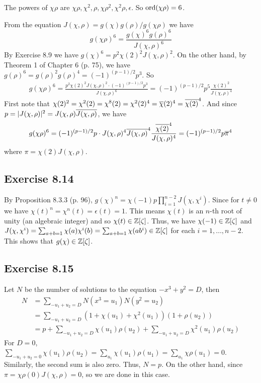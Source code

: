 \documentclass[../I&R.tex]{subfiles}
\begin{document}
The powers of $\chi\rho$ are $\chi\rho,\chi^2,\rho,\chi\rho^2,\chi^2\rho,\epsilon$. So $\operatorname{ord}(\chi\rho)=6$.

From the equation $J(\chi,\rho)=g(\chi)g(\rho)/g(\chi\rho)$ we have $$g(\chi\rho)^6=\frac{g(\chi)^6g(\rho)^6}{J(\chi,\rho)^6}$$ By Exercise 8.9 we have $g(\chi)^6=p^2\chi(2)^2J(\chi,\rho)^2$. On the other hand, by Theorem 1 of Chapter 6 (p. 75), we have $g(\rho)^6=g(\rho)^2g(\rho)^4=(-1)^{(p-1)/2}p^3$. So
\begin{align*}
    g(\chi\rho)^6 = \frac{p^2\chi(2)^2J(\chi,\rho)^2\cdot(-1)^{(p-1)/2}p^3}{J(\chi,\rho)^6} = (-1)^{(p-1)/2}p^5\frac{\chi(2)^2}{J(\chi,\rho)^4}
\end{align*}
First note that $\chi(2)^2=\chi^2(2)=\chi^8(2)=\chi^2(2)^4=\overline{\chi}(2)^4=\overline{\chi(2)}^4$. And since $p=|J(\chi,\rho)|^2=J(\chi,\rho)\overline{J(\chi,\rho)}$, we have
\begin{align*}
    g(\chi\rho)^6 = (-1)^{(p-1)/2}p\cdot J(\chi,\rho)^4\overline{J(\chi,\rho)}^4\frac{\overline{\chi(2)}^4}{J(\chi,\rho)^4} = (-1)^{(p-1)/2}p\overline{\pi}^4
\end{align*}
where $\pi=\chi(2)J(\chi,\rho)$.

\subsection*{Exercise 8.14}

By Proposition 8.3.3 (p. 96), $g(\chi)^n=\chi(-1)p\prod_{i=1}^{n-2} J(\chi,\chi^i)$. Since for $t\neq0$ we have $\chi(t)^n=\chi^n(t)=\epsilon(t)=1$. This means $\chi(t)$ is an $n$-th root of unity (an algebraic integer) and so $\chi(t)\in\mathbb{Z}[\zeta]$. Thus, we have $\chi(-1)\in\mathbb{Z}[\zeta]$ and $J(\chi,\chi^i)=\sum_{a+b=1} \chi(a)\chi^i(b)=\sum_{a+b=1} \chi(ab^i)\in\mathbb{Z}[\zeta]$ for each $i=1,\ldots,n-2$. This shows that $g(\chi)\in\mathbb{Z}[\zeta]$.

\subsection*{Exercise 8.15}

Let $N$ be the number of solutions to the equation $-x^3+y^2=D$, then 
\begin{align*}
    N &= \sum_{-u_1+u_2=D} N(x^3=u_1)N(y^2=u_2) \\
    &= \sum_{-u_1+u_2=D} (1+\chi(u_1)+\chi^2(u_1))(1+\rho(u_2)) \\
    &= p + \sum_{-u_1+u_2=D} \chi(u_1)\rho(u_2) + \sum_{-u_1+u_2=D} \chi^2(u_1)\rho(u_2)
\end{align*}
For $D=0$, $\sum_{-u_1+u_2=0} \chi(u_1)\rho(u_2) = \sum_{u_1} \chi(u_1)\rho(u_1) = \sum_{u_1} \chi\rho(u_1) = 0$. Similarly, the second sum is also zero. Thus, $N=p$. On the other hand, since $\pi=\chi\rho(0)J(\chi,\rho)=0$, so we are done in this case.
\end{document}
